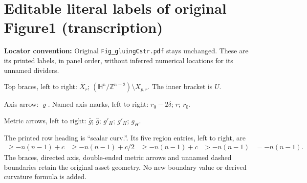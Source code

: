 \section*{Editable literal labels of original Figure1 (transcription)}
\noindent\textbf{Locator convention:} Original \texttt{Fig\_gluingCstr.pdf} stays unchanged. These are its printed labels, in panel order, without inferred numerical locations for its unnamed dividers.
\par\noindent Top braces, left to right: $\bar X_r$; $(\mathbb{H}^n/\mathbb{Z}^{n-2})\setminus X_{p,r}$. The inner bracket is $U$.
\par\noindent Axis arrow: $\varrho$. Named axis marks, left to right: $r_0-2\delta$; $r$; $r_0$.
\par\noindent Metric arrows, left to right: $\bar g$; $\hat g$; $g'_H$; $g'_H$; $g_H$.
\par\noindent The printed row heading is ``scalar curv.''. Its five region entries, left to right, are
\[
\begin{array}{ccccc}
\ge -n(n-1)+c & \ge -n(n-1)+c/2 & \ge -n(n-1)+c & > -n(n-1) & = -n(n-1).
\end{array}
\]
\noindent The braces, directed axis, double-ended metric arrows and unnamed dashed boundaries retain the original asset geometry. No new boundary value or derived curvature formula is added.
